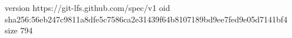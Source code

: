 version https://git-lfs.github.com/spec/v1
oid sha256:56eb247c9811a8dfe5c7586ca2e31439f64b8107189bd9ee7fed9e05d7141bf4
size 794
